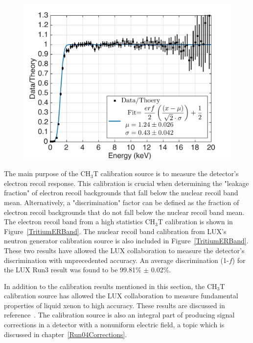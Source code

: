 \begin{figure} [!h]
\includegraphics[scale=.4]{TritiumThreshold.pdf} 
\label{TritiumThreshold}
\end{figure}

The main purpose of the CH$_3$T calibration source is to measure the detector's electron recoil response.  This calibration is crucial when determining the "leakage fraction" of electron recoil backgrounds that fall below the nuclear recoil band mean.  Alternatively, a "discrimination" factor can be defined as the fraction of electron recoil backgrounds that do not fall below the nuclear recoil band mean.  The electron recoil band from a high statistics CH$_3$T calibration is shown in Figure~\ref{TritiumERBand}.  The nuclear recoil band calibration from LUX's neutron generator calibration source is also included in Figure~\ref{TritiumERBand}. These two results have allowed the LUX collaboration to measure the detector's discrimination with unprecedented accuracy.  An average discrimination (1-$f$) for the LUX Run3 result was found to be 99.81\% $\pm$ 0.02\%.

In addition to the calibration results mentioned in this section, the CH$_3$T calibration source has allowed the LUX collaboration to measure fundamental properties of liquid xenon to high accuracy.  These results are discussed in reference~\cite{TritiumPaper}.  The calibration source is also an integral part of producing signal corrections in a detector with a nonuniform electric field, a topic which is discussed in chapter~\ref{Run04Corrections}.


